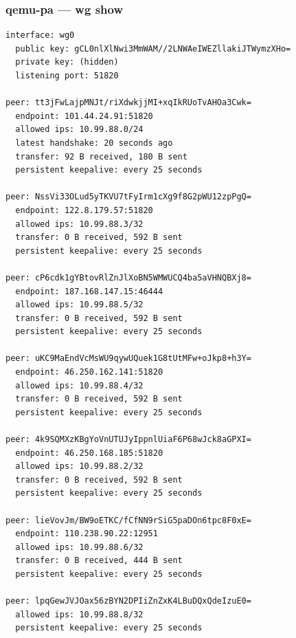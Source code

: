 \documentclass[11pt,a4paper]{article}
\begin{document}
\subsubsection*{qemu-pa — wg show}
\begin{lstlisting}
interface: wg0
  public key: gCL0nlXlNwi3MmWAM//2LNWAeIWEZllakiJTWymzXHo=
  private key: (hidden)
  listening port: 51820

peer: tt3jFwLajpMNJt/riXdwkjjMI+xqIkRUoTvAHOa3Cwk=
  endpoint: 101.44.24.91:51820
  allowed ips: 10.99.88.0/24
  latest handshake: 20 seconds ago
  transfer: 92 B received, 180 B sent
  persistent keepalive: every 25 seconds

peer: NssVi33OLud5yTKVU7tFyIrm1cXg9f8G2pWU12zpPgQ=
  endpoint: 122.8.179.57:51820
  allowed ips: 10.99.88.3/32
  transfer: 0 B received, 592 B sent
  persistent keepalive: every 25 seconds

peer: cP6cdk1gYBtovRlZnJlXoBN5WMWUCQ4ba5aVHNQBXj8=
  endpoint: 187.168.147.15:46444
  allowed ips: 10.99.88.5/32
  transfer: 0 B received, 592 B sent
  persistent keepalive: every 25 seconds

peer: uKC9MaEndVcMsWU9qywUQuek1G8tUtMFw+oJkp8+h3Y=
  endpoint: 46.250.162.141:51820
  allowed ips: 10.99.88.4/32
  transfer: 0 B received, 592 B sent
  persistent keepalive: every 25 seconds

peer: 4k9SQMXzKBgYoVnUTUJyIppnlUiaF6P68wJck8aGPXI=
  endpoint: 46.250.168.185:51820
  allowed ips: 10.99.88.2/32
  transfer: 0 B received, 592 B sent
  persistent keepalive: every 25 seconds

peer: lieVovJm/BW9oETKC/fCfNN9rSiG5paDOn6tpc8F0xE=
  endpoint: 110.238.90.22:12951
  allowed ips: 10.99.88.6/32
  transfer: 0 B received, 444 B sent
  persistent keepalive: every 25 seconds

peer: lpqGewJVJOax56zBYN2DPIiZnZxK4LBuDQxQdeIzuE0=
  allowed ips: 10.99.88.8/32
  persistent keepalive: every 25 seconds

\end{lstlisting}
\end{document}
